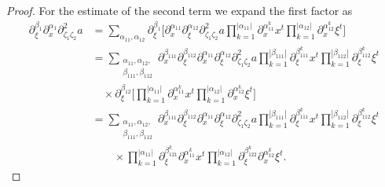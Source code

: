 \documentclass{amsart}
\theoremstyle{definition}
\begin{document}
\begin{proof}
For the estimate of the second term we expand the first factor as
\begin{equation*}
\begin{split}
\partial_{\xi}^{\beta_1} \partial_x^{\alpha_1} \partial^2_{\zeta_1 \zeta_2} a 
&= \sum_{\alpha_{11},\alpha_{12}} \partial_{\xi}^{\beta_1} \big[ \partial_x^{\alpha_{11}} \partial_{\xi}^{\alpha_{12}} \partial^2_{\zeta_1 \zeta_2} a \prod_{k=1}^{|\alpha_{11}|} \partial_x^{\alpha_{11}^k} x^t \prod_{k=1}^{|\alpha_{12}|} \partial_x^{\alpha_{12}^k} \xi^t \big] \\
&= \sum_{\substack{\alpha_{11},\alpha_{12}, \\ \beta_{111},\beta_{112}}} \partial_x^{\beta_{111}} \partial_{\xi}^{\beta_{112}} \partial_x^{\alpha_{11}} \partial_{\xi}^{\alpha_{12}} \partial^2_{\zeta_1 \zeta_2} a \prod_{k=1}^{|\beta_{111}|} \partial_{\xi}^{\beta_{111}^k} x^t \prod_{k=1}^{|\beta_{112}|} \partial_{\xi}^{\beta_{112}^k} \xi^t \\
&\quad \times \partial_{\xi}^{\beta_{12}} \big[ \prod_{k=1}^{|\alpha_{11}|} \partial_x^{\alpha_{11}^k} x^t \prod_{k=1}^{|\alpha_{12}|} \partial_x^{\alpha_{12}^k} \xi^t \big] \\
&= \sum_{\substack{\alpha_{11},\alpha_{12}, \\ \beta_{111},\beta_{112}}} \partial_x^{\beta_{111}} \partial_{\xi}^{\beta_{112}} \partial_x^{\alpha_{11}} \partial_{\xi}^{\alpha_{12}} \partial^2_{\zeta_1 \zeta_2} a \prod_{k=1}^{|\beta_{111}|} \partial_{\xi}^{\beta_{111}^k} x^t \prod_{k=1}^{|\beta_{112}|} \partial_{\xi}^{\beta_{112}^k} \xi^t \\
&\quad \quad \times \prod_{k=1}^{|\alpha_{11}|} \partial_{\xi}^{\beta_{121}^k} \partial_x^{\alpha_{11}^k} x^t \prod_{k=1}^{|\alpha_{12}|} \partial_{\xi}^{\beta_{122}^k} \partial_x^{\alpha_{12}^k} \xi^t.
\end{split}
\end{equation*}


\end{proof}
\end{document}
